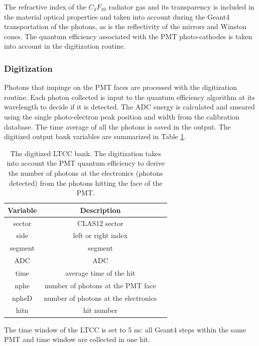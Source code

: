 The refractive index of the $C_4F_{10}$ radiator gas and its transparency is included in the material
optical properties and taken into account during the Geant4 transportation of the photons,
as is the reflectivity of the mirrors and Winston cones.
The quantum efficiency associated with the PMT photo-cathodes is taken into account in
the digitization routine.

\subsubsection{Digitization}

Photons that impinge on the PMT faces are processed with the digitization routine.
Each photon collected is input to the quantum efficiency algorithm at its wavelength to decide if it is detected.
The ADC energy is calculated and smeared using the single photo-electron peak position and width from the calibration database.
The time average of all the photons is saved in the output.
The digitized output bank variables are summarized in Table \ref{tab:ltccBank}.

\begin{table}[h]
	\begin{center}
		\begin{tabular}{| c | c | c |}
			\hline \hline
			Variable & Description                                         \\
			\hline
             sector  &                                     CLAS12 sector     \\
               side  &                               left or right index     \\
            segment  &                                           segment     \\
                ADC  &                                               ADC     \\
               time  &                           average time of the hit     \\
               nphe  &                 number of photons at the PMT face     \\
              npheD  &              number of photons at the electronics     \\
               hitn  &                                        hit number     \\
			\hline \hline
		\end{tabular}
	\end{center}
	\caption{The digitized LTCC bank. The digitization takes into account the PMT quantum efficiency
             to derive the number of photons at the electronics (photons detected) from the photons
             hitting the face of the PMT.}\label{tab:ltccBank}
\end{table}

The time window  of the LTCC is set to 5 ns: all Geant4 steps within the same PMT and time window are collected in one hit.
